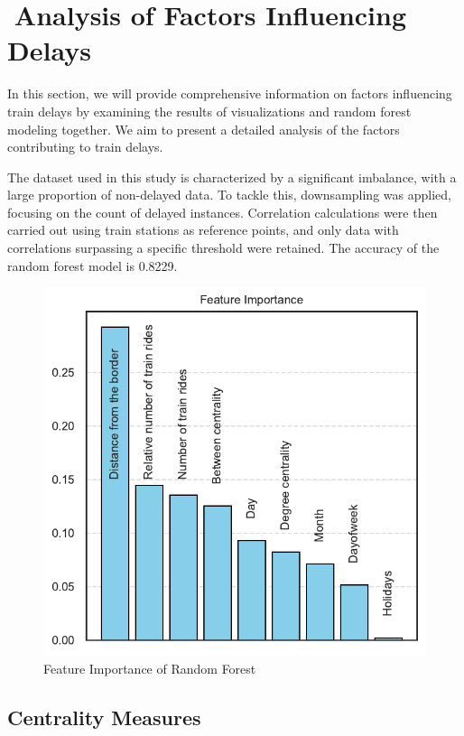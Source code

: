 \documentclass{article}
\theoremstyle{plain}
\theoremstyle{definition}
\theoremstyle{remark}
\begin{document}
\section{Analysis of Factors Influencing Delays}

In this section, we will provide comprehensive information on factors influencing train delays by examining the results of visualizations and random forest modeling together. We aim to present a detailed analysis of the factors contributing to train delays.

The dataset used in this study is characterized by a significant imbalance, with a large proportion of non-delayed data. To tackle this, downsampling was applied, focusing on the count of delayed instances. Correlation calculations were then carried out using train stations as reference points, and only data with correlations surpassing a specific threshold were retained. The accuracy of the random forest model is 0.8229.
\begin{figure}
    \centering
    \includegraphics[width=1\linewidth]{feature_importance.pdf}
    \caption{Feature Importance of Random Forest}
    \label{fig:enter-label}
\end{figure}

\subsection{{Centrality Measures}}
\end{document}
